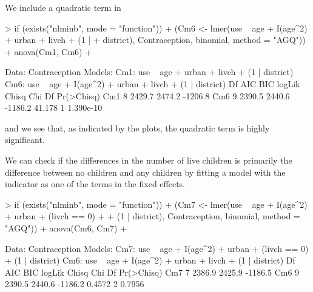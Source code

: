 \documentclass[12pt]{article}
\begin{document}
We include a quadratic term in 
\begin{Schunk}
\begin{Sinput}
> if (exists("nlminb", mode = "function")) {
+     (Cm6 <- lmer(use ~ age + I(age^2) + urban + livch + (1 | 
+         district), Contraception, binomial, method = "AGQ"))
+     anova(Cm1, Cm6)
+ }
\end{Sinput}
\begin{Soutput}
Data: Contraception
Models:
Cm1: use ~ age + urban + livch + (1 | district)
Cm6: use ~ age + I(age^2) + urban + livch + (1 | district)
    Df     AIC     BIC  logLik  Chisq Chi Df Pr(>Chisq)
Cm1  8  2429.7  2474.2 -1206.8                         
Cm6  9  2390.5  2440.6 -1186.2 41.178      1  1.390e-10
\end{Soutput}
\end{Schunk}
and we see that, as indicated by the plots, the quadratic term is highly significant.

We can check if the differences in the number of live children is
primarily the difference between no children and any children by
fitting a model with the indicator  as one of the
terms in the fixed effects.
\begin{Schunk}
\begin{Sinput}
> if (exists("nlminb", mode = "function")) {
+     (Cm7 <- lmer(use ~ age + I(age^2) + urban + (livch == 0) + 
+         (1 | district), Contraception, binomial, method = "AGQ"))
+     anova(Cm6, Cm7)
+ }
\end{Sinput}
\begin{Soutput}
Data: Contraception
Models:
Cm7: use ~ age + I(age^2) + urban + (livch == 0) + (1 | district)
Cm6: use ~ age + I(age^2) + urban + livch + (1 | district)
    Df     AIC     BIC  logLik  Chisq Chi Df Pr(>Chisq)
Cm7  7  2386.9  2425.9 -1186.5                         
Cm6  9  2390.5  2440.6 -1186.2 0.4572      2     0.7956
\end{Soutput}
\end{Schunk}
\end{document}
